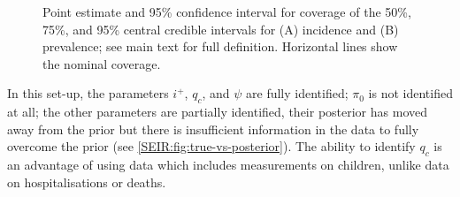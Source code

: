 \documentclass[thesis.tex]{subfiles}
\begin{document}
\begin{figure}
    \vspace{-3cm}
    \caption[Coverage of simulation study (derived quantities)]{%
        Point estimate and 95\% confidence interval for coverage of the 50\%, 75\%, and 95\% central credible intervals for (A) incidence and (B) prevalence; see main text for full definition.
        Horizontal lines show the nominal coverage.
    }
    \label{SEIR:fig:sim-inc-prev}
\end{figure}


In this set-up, the parameters $i^+$, $q_c$, and $\psi$ are fully identified; $\pi_0$ is not identified at all; the other parameters are partially identified, their posterior has moved away from the prior but there is insufficient information in the data to fully overcome the prior (see \cref{SEIR:fig:true-vs-posterior}).
The ability to identify $q_c$ is an advantage of using data which includes measurements on children, unlike data on hospitalisations or deaths.
\end{document}
